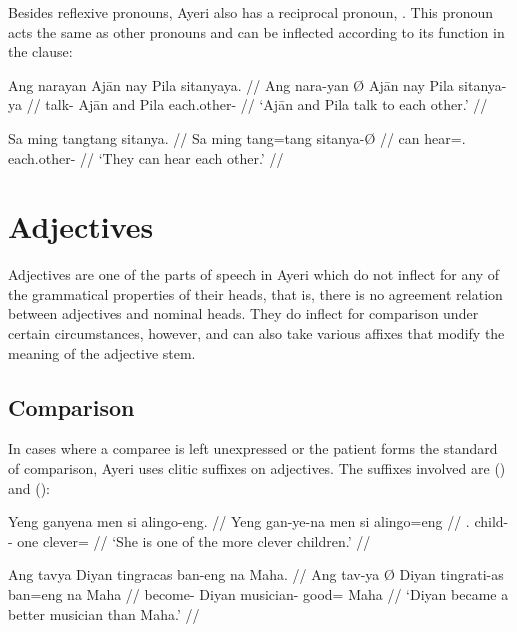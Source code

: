 Besides reflexive pronouns, Ayeri also has a reciprocal pronoun, 
. This pronoun acts the same as other pronouns 
and can be inflected according to its function in the clause:

\pex
\a\begingl
	\gla Ang narayan {} Ajān nay Pila sitanyaya. //
	\glb Ang nara-yan Ø Ajān nay Pila sitanya-ya //
	\glc \AgtT{} talk-\TplM{} \Top{} Ajān and Pila each.other-\Loc{} //
	\glft `Ajān and Pila talk to each other.' //
\endgl

\a\begingl
	\gla Sa ming tangtang sitanya. //
	\glb Sa ming tang=tang sitanya-Ø //
	\glc \PatT{} can hear=\TplM{}.\Aarg{} each.other-\Top{} //
	\glft `They can hear each other.' //
\endgl

\xe



\section{Adjectives}

Adjectives are one of the parts of speech in Ayeri which do not inflect for any 
of the grammatical properties of their heads, that is, there is no agreement 
relation between adjectives and nominal heads. They do inflect for comparison 
under certain circumstances, however, and can also take various affixes that 
modify the meaning of the adjective stem.

\subsection{Comparison}
\label{subsec:adjcomp}

In cases where a comparee is left unexpressed or the patient forms the 
standard of comparison, Ayeri uses clitic suffixes on adjectives. The suffixes 
involved are  (\Comp{}) and  (\Supl{}):

\pex\label{ex:sfxcomp}
\a\label{ex:sfxcomp2}\begingl
	\gla Yeng ganyena men si alingo-eng. //
	\glb Yeng gan-ye-na men si alingo=eng //
	\glc \TsgF{}.\Aarg{} child-\Pl{}-\Gen{} one \Rel{} clever=\Comp{} //
	\glft `She is one of the more clever children.' //
\endgl

\a\label{ex:sfxcomp1}\begingl
	\gla Ang tavya {} Diyan tingracas ban-eng na Maha. //
	\glb Ang tav-ya Ø Diyan tingrati-as ban=eng na Maha //
	\glc \AgtT{} become-\TsgM{} \Top{} Diyan musician-\Parg{} good=\Comp{} 
		\Gen{} Maha //
	\glft `Diyan became a better musician than Maha.' //
\endgl

